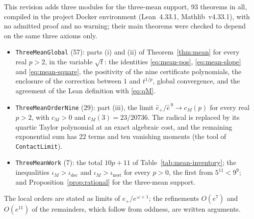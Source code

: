 This revision adds three modules for the three-mean support, 93 theorems in all, compiled in the
project Docker environment (Lean~4.33.1, Mathlib~v4.33.1), with no admitted proof and no warning; their
main theorems were checked to depend on the same three axioms only.
\begin{itemize}
\item \texttt{ThreeMeanGlobal} (57): parts (i) and (ii) of Theorem~\ref{thm:mean} for every real $p>2$,
  in the variable $\sqrt t$: the identities \eqref{eq:mean-pos}, \eqref{eq:mean-slope} and
  \eqref{eq:mean-square}, the positivity of the nine certificate polynomials, the enclosure of the
  correction between $1$ and $t^{1/p}$, global convergence, and the agreement of the Lean definition
  with \eqref{eq:qM}.
\item \texttt{ThreeMeanOrderNine} (29): part (iii), the limit $\hat e_+/\hat e^{\,9}\to c_M(p)$ for
  every real $p>2$, with $c_M>0$ and $c_M(3)=23/20736$. The radical is replaced by its quartic Taylor
  polynomial at an exact algebraic cost, and the remaining exponential sum has $22$ terms and ten
  vanishing moments (the tool of \texttt{ContactLimit}).
\item \texttt{ThreeMeanWork} (7): the total $10p+11$ of Table~\ref{tab:mean-inventory}; the
  inequalities $\iota_M>\iota_{\mathrm{dec}}$ and $\iota_M>\iota_{\mathrm{nest}}$ for every $p>0$, the
  first from $5^{11}<9^{9}$; and Proposition~\ref{prop:rational} for the three-mean support.
\end{itemize}
The local orders are stated as limits of $e_+/e^{\,\omega+1}$; the refinements $O(e^{7})$ and
$O(e^{11})$ of the remainders, which follow from oddness, are written arguments.

